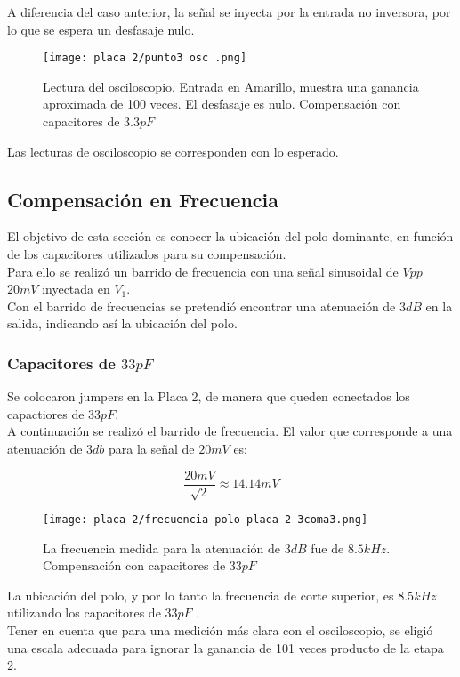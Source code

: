 \documentclass[letterpaper, 10 pt, conference]{ieeeconf}  %
\begin{document}
A diferencia del caso anterior, la señal se inyecta por la entrada no inversora, por lo que se espera un desfasaje nulo.\\


\begin{figure}[H]
  \centering
  \texttt{[image: placa 2/punto3 osc .png]}
  \caption{Lectura del osciloscopio. Entrada en Amarillo, muestra una ganancia aproximada de 100 veces. El desfasaje es nulo. Compensación con capacitores de $3.3pF$ }
  \label{fig:fotoplaca2}
\end{figure}

Las lecturas de osciloscopio se corresponden con lo esperado.


\subsection{Compensación en Frecuencia} 
El objetivo de esta sección es conocer la ubicación del polo dominante, en función de los capacitores utilizados para su compensación. \\
Para ello se realizó un barrido de frecuencia con una señal sinusoidal de $Vpp$ $20mV$ inyectada en $V_1$.\\
Con el barrido de frecuencias se pretendió encontrar una atenuación de $3dB$ en la salida, indicando así la ubicación del polo.


\subsubsection{Capacitores de $33pF$} 
Se colocaron jumpers en la Placa 2, de manera que queden conectados los capactiores de $33pF$.\\
A continuación se realizó el barrido de frecuencia. El valor que corresponde a una atenuación de $3db$ para la señal de $20mV$ es:

            \begin{equation}
            \frac{20mV}{\sqrt{2}} \approx 14.14mV 
            \end{equation}

\begin{figure}[H]
  \centering
  \texttt{[image: placa 2/frecuencia polo placa 2 3coma3.png]}
  \caption{La frecuencia medida para la atenuación de $3dB$ fue de $8.5kHz$. Compensación con capacitores de $33pF$ }
  \label{fig:fotoplaca2}
\end{figure}

La ubicación del polo, y por lo tanto la frecuencia de corte superior, es $8.5kHz$ utilizando los capacitores de $33pF$ . \\Tener en cuenta que para una medición más clara con el osciloscopio, se eligió una escala adecuada para ignorar la ganancia de 101 veces producto de la etapa 2.
\end{document}
